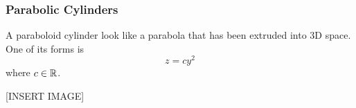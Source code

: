 \subsubsection{Parabolic Cylinders}
\noindent
A paraboloid cylinder look like a parabola that has been extruded into 3D space. One of its forms is
\begin{equation*}
	z = cy^2	
\end{equation*} 
where $c \in \mathbb{R}$.

[INSERT IMAGE]